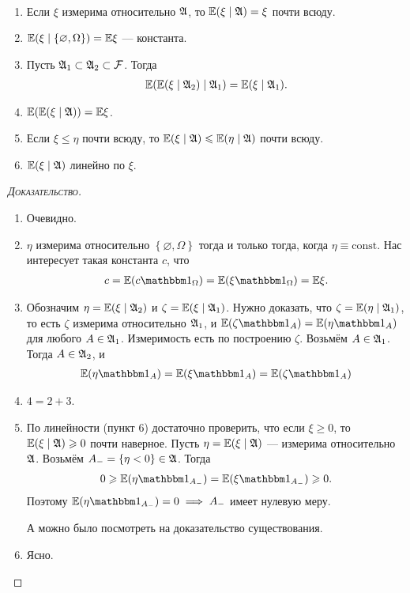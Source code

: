 \documentclass[../main.tex]{subfiles}
\begin{document}
\begin{prop}[свойства]\
 \begin{enumerate}
  \item Если $ \xi $ измерима относительно $ \mathfrak A $, то $ \mathbb E(\xi \mid \mathfrak A) = \xi $ почти всюду.
  \item $ \mathbb E(\xi\mid \left\{ \varnothing,\Omega \right\}) = \mathbb E \xi $ --- константа.
  \item Пусть $ \mathfrak A_1 \subset \mathfrak A_2 \subset \mathcal F $. Тогда
   \begin{align*}
    \mathbb E(\mathbb E(\xi \mid \mathfrak A_2) \mid \mathfrak A_1) = \mathbb E(\xi \mid \mathfrak A_1).
   \end{align*}
  \item $ \mathbb E(\mathbb E(\xi \mid \mathfrak A)) = \mathbb E \xi $.
  \item Если $ \xi \leqslant \eta $ почти всюду, то $ \mathbb E(\xi \mid \mathfrak A) \leqslant \mathbb E(\eta \mid \mathfrak A) $ почти всюду.
  \item $ \mathbb E(\xi \mid \mathfrak A) $ линейно по $ \xi $.
 \end{enumerate}
\end{prop}
\begin{proof}[\normalfont\textsc{Доказательство}]\
 \begin{enumerate}
  \item Очевидно.
  \item $ \eta $ измерима относительно $ \left\{ \varnothing, \Omega \right\} $ тогда и только тогда, когда $ \eta \equiv \mathrm{const} $. Нас интересует такая константа $ c $, что
   \begin{align*}
    c = \E(c \Ind_\Omega) = \E(\xi \Ind_\Omega) = \E\xi.
   \end{align*}
  \item Обозначим $ \eta = \mathbb E(\xi \mid \mathfrak A_2) $ и $ \zeta = \mathbb E(\xi \mid \mathfrak A_1) $. Нужно доказать, что $ \zeta = \mathbb E(\eta \mid \mathfrak A_1) $, то есть $ \zeta $ измерима относительно $ \mathfrak A_1 $, и $ \E(\zeta\Ind_A) = \E(\eta\Ind_A) $ для любого $ A \in \mathfrak A_1 $. Измеримость есть по построению $ \zeta $. Возьмём $ A \in \mathfrak A_1 $. Тогда $ A \in \mathfrak A_2 $, и
   \begin{align*}
    \E(\eta \Ind_A) = \E(\xi\Ind_A) = \E(\zeta \Ind_A)
   \end{align*}

  \item $ 4 = 2 + 3 $.
  \item По линейности (пункт 6) достаточно проверить, что если $ \xi \geqslant 0 $, то $ \mathbb E(\xi \mid \mathfrak A) \geqslant 0 $ почти наверное. Пусть $ \eta = \mathbb E(\xi \mid \mathfrak A) $ --- измерима относительно $ \mathfrak A $. Возьмём $ A_- = \left\{ \eta < 0 \right\} \in \mathfrak A $. Тогда 
   \begin{align*}
    0\geqslant \E(\eta \Ind_{A_-}) = \E(\xi\Ind_{A_-}) \geqslant 0.
   \end{align*} Поэтому $ \E(\eta \Ind_{A_-}) = 0 \implies A_- $ имеет нулевую меру.

   А можно было посмотреть на доказательство существования.
  \item Ясно.
 \end{enumerate}
\end{proof}
\end{document}
